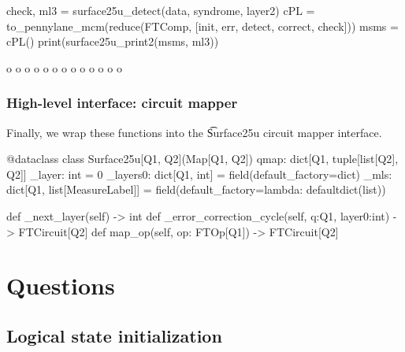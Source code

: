   \begin{python}
  check, ml3 = surface25u_detect(data, syndrome, layer2)
  cPL = to_pennylane_mcm(reduce(FTComp, [init, err, detect, correct, check]))
  msms = cPL()
  print(surface25u_print2(msms, ml3))
  \end{python}

  \begin{result}

  o   o   o
    o   o 
  o   o   o
    o   o 
  o   o   o

  \end{result}

\subsubsection{High-level interface: circuit mapper}

Finally, we wrap these functions into the \t{Surface25u} circuit mapper interface.

  \begin{python}
  @dataclass
  class Surface25u[Q1, Q2](Map[Q1, Q2])
    qmap: dict[Q1, tuple[list[Q2], Q2]]
    _layer: int = 0
    _layers0: dict[Q1, int] = field(default_factory=dict)
    _mls: dict[Q1, list[MeasureLabel]] = field(default_factory=lambda: defaultdict(list))

    def _next_layer(self) -> int
    def _error_correction_cycle(self, q:Q1, layer0:int) -> FTCircuit[Q2]
    def map_op(self, op: FTOp[Q1]) -> FTCircuit[Q2]
  \end{python}

\section{Questions}


\subsection{Logical state initialization}


